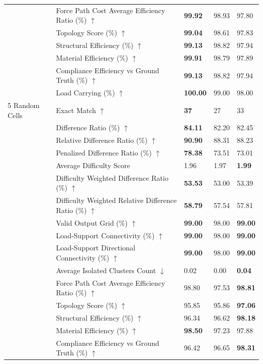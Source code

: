 \begin{table}[!h]
{\begin{tabular}{lllll}
 & Force Path Cost Average Efficiency Ratio (\%) $\uparrow$ & \textbf{99.92} & 98.93 & 97.80 \\
 & Topology Score (\%) $\uparrow$ & \textbf{99.04} & 98.61 & 97.83 \\
 & Structural Efficiency (\%) $\uparrow$ & \textbf{99.13} & 98.82 & 97.94 \\
 & Material Efficiency (\%) $\uparrow$ & \textbf{99.91} & 98.79 & 97.89 \\
 & Compliance Efficiency vs Ground Truth (\%) $\uparrow$ & \textbf{99.13} & 98.82 & 97.94 \\
 & Load Carrying (\%) $\uparrow$ & \textbf{100.00} & 99.00 & 98.00 \\
5 Random Cells & Exact Match $\uparrow$ & \textbf{37} & 27 & 33 \\
 & Difference Ratio (\%) $\uparrow$ & \textbf{84.11} & 82.20 & 82.45 \\
 & Relative Difference Ratio (\%) $\uparrow$ & \textbf{90.90} & 88.31 & 88.23 \\
 & Penalized Difference Ratio (\%) $\uparrow$ & \textbf{78.38} & 73.51 & 73.01 \\
 & Average Difficulty Score & 1.96 & 1.97 & \textbf{1.99} \\
 & Difficulty Weighted Difference Ratio (\%) $\uparrow$ & \textbf{53.53} & 53.00 & 53.39 \\
 & Difficulty Weighted Relative Difference Ratio (\%) $\uparrow$ & \textbf{58.79} & 57.54 & 57.81 \\
 & Valid Output Grid (\%) $\uparrow$ & \textbf{99.00} & 98.00 & \textbf{99.00} \\
 & Load-Support Connectivity (\%) $\uparrow$ & \textbf{99.00} & 98.00 & \textbf{99.00} \\
 & Load-Support Directional Connectivity (\%) $\uparrow$ & \textbf{99.00} & 98.00 & \textbf{99.00} \\
 & Average Isolated Clusters Count $\downarrow$ & 0.02 & 0.00 & \textbf{0.04} \\
 & Force Path Cost Average Efficiency Ratio (\%) $\uparrow$ & 98.80 & 97.53 & \textbf{98.81} \\
 & Topology Score (\%) $\uparrow$ & 95.85 & 95.86 & \textbf{97.06} \\
 & Structural Efficiency (\%) $\uparrow$ & 96.34 & 96.62 & \textbf{98.18} \\
 & Material Efficiency (\%) $\uparrow$ & \textbf{98.50} & 97.23 & 97.88 \\
 & Compliance Efficiency vs Ground Truth (\%) $\uparrow$ & 96.42 & 96.65 & \textbf{98.31} \\

\end{tabular}}
\end{table}
